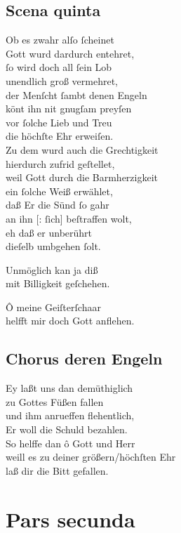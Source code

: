 \documentclass{ees}
\newenvironment{lyrics}[1]{%
  \subsection{#1}\nopagebreak%
  \begin{lyricslist}%
  \let\voice\item%
}{%
  \end{lyricslist}%
}
\begin{document}
\begin{lyrics}{Scena quinta}
  \voice[Barmh.]
  Ob es zwahr alſo ſcheinet\\
  Gott wurd dardurch entehret,\\
  ſo wird doch all ſein Lob\\
  unendlich groß vermehret,\\
  der Menſcht ſambt denen Engeln\\
  könt ihn nit gnugſam preyſen\\
  vor ſolche Lieb und Treu\\
  die höchſte Ehr erweiſen.\\
  Zu dem wurd auch die Grechtigkeit\\
  hierdurch zufrid geſtellet,\\
  weil Gott durch die Barmherzigkeit\\
  ein ſolche Weiß erwählet,\\
  daß Er die Sünd ſo gahr\\
  an ihn [: ſich] beſtraffen wolt,\\
  eh daß er unberührt\\
  dieſelb umbgehen ſolt.

  \voice[Gerecht.]
  Unmöglich kan ja diß\\
  mit Billigkeit geſchehen.

  \voice[Barmh.]
  Ô meine Geiſterſchaar\\
  helfft mir doch Gott anflehen.
\end{lyrics}

\begin{lyrics}{Chorus deren Engeln}
  \voice[Chorus]
  Ey laßt uns dan demüthiglich\\
  zu Gottes Füßen fallen\\
  und ihm anrueffen flehentlich,\\
  Er woll die Schuld bezahlen.\\[1ex]
  So helffe dan ô Gott und Herr\\
  weill es zu deiner größern/höchſten Ehr\\
  laß dir die Bitt gefallen.
\end{lyrics}

\clearpage
\section{Pars secunda}
\end{document}
